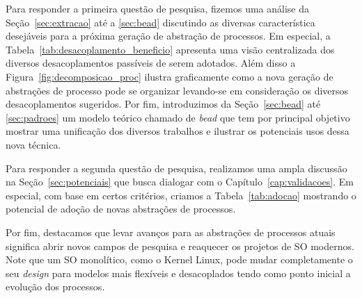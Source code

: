 Para responder a primeira questão de pesquisa, fizemos uma análise da
Seção~\ref{sec:extracao} até a \ref{sec:bead} discutindo as diversas
característica desejáveis para a próxima geração de abstração de processos. Em
especial, a Tabela~\ref{tab:desacoplamento_beneficio} apresenta uma visão
centralizada dos diversos desacoplamentos passíveis de serem adotados. Além
disso a Figura~\ref{fig:decomposicao_proc} ilustra graficamente como a nova
geração de abstrações de processo pode se organizar levando-se em consideração
os diversos desacoplamentos sugeridos. Por fim, introduzimos da
Seção~\ref{sec:bead} até \ref{sec:padroes} um modelo teórico chamado de
\emph{bead} que tem por principal objetivo mostrar uma unificação dos diversos
trabalhos e ilustrar os potenciais usos dessa nova técnica.

Para responder a segunda questão de pesquisa, realizamos uma ampla discussão na
Seção~\ref{sec:potenciais} que busca dialogar com o
Capítulo~\ref{cap:validacoes}. Em especial, com base em certos critérios,
criamos a Tabela~\ref{tab:adocao} mostrando o potencial de adoção de novas
abstrações de processos.

Por fim, destacamos que levar avanços para as abstrações de processos atuais
significa abrir novos campos de pesquisa e reaquecer os projetos de SO
modernos. Note que um SO monolítico, como o Kernel Linux, pode mudar
completamente o seu \emph{design} para modelos mais flexíveis e desacoplados
tendo como ponto inicial a evolução dos processos. 

